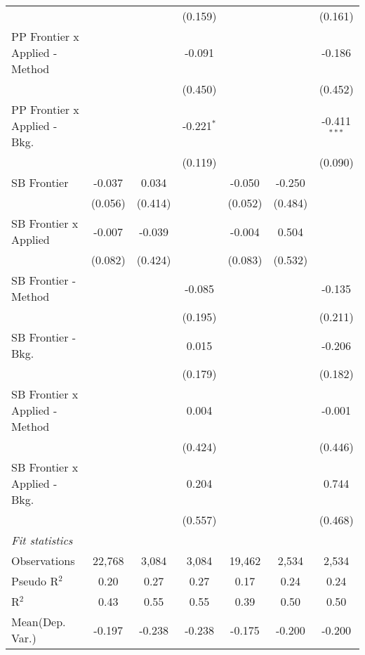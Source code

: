 \begin{tabular}{lcccccc}
                                  &               &         & (0.159)      &               &         & (0.161)\\   
   PP Frontier x Applied - Method &               &         & -0.091       &               &         & -0.186\\   
                                  &               &         & (0.450)      &               &         & (0.452)\\   
   PP Frontier x Applied - Bkg.   &               &         & -0.221$^{*}$ &               &         & -0.411$^{***}$\\   
                                  &               &         & (0.119)      &               &         & (0.090)\\   
   SB Frontier                    & -0.037        & 0.034   &              & -0.050        & -0.250  &   \\   
                                  & (0.056)       & (0.414) &              & (0.052)       & (0.484) &   \\   
   SB Frontier x Applied          & -0.007        & -0.039  &              & -0.004        & 0.504   &   \\   
                                  & (0.082)       & (0.424) &              & (0.083)       & (0.532) &   \\   
   SB Frontier - Method           &               &         & -0.085       &               &         & -0.135\\   
                                  &               &         & (0.195)      &               &         & (0.211)\\   
   SB Frontier - Bkg.             &               &         & 0.015        &               &         & -0.206\\   
                                  &               &         & (0.179)      &               &         & (0.182)\\   
   SB Frontier x Applied - Method &               &         & 0.004        &               &         & -0.001\\   
                                  &               &         & (0.424)      &               &         & (0.446)\\   
   SB Frontier x Applied - Bkg.   &               &         & 0.204        &               &         & 0.744\\   
                                  &               &         & (0.557)      &               &         & (0.468)\\   
   \midrule
   \emph{Fit statistics}\\
   Observations                   & 22,768        & 3,084   & 3,084        & 19,462        & 2,534   & 2,534\\  
   Pseudo R$^2$                   & 0.20          & 0.27    & 0.27         & 0.17          & 0.24    & 0.24\\  
   R$^2$                          & 0.43          & 0.55    & 0.55         & 0.39          & 0.50    & 0.50\\  
Mean(Dep. Var.) & -0.197 & -0.238 & -0.238 & -0.175 & -0.200 & -0.200 \\
   

\end{tabular}
